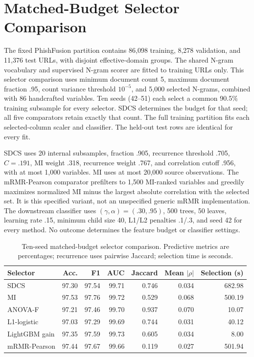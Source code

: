 \documentclass[10pt]{article}
\newenvironment{bluechange}{\color{black}}{}
\begin{document}
\section{Matched-Budget Selector Comparison}
\begin{bluechange}
The fixed PhishFusion partition contains 86,098 training, 8,278 validation, and 11,376 test URLs, with disjoint effective-domain groups. The shared N-gram vocabulary and supervised N-gram scorer are fitted to training URLs only. This selector comparison uses minimum document count 5, maximum document fraction .95, count variance threshold $10^{-5}$, and 5,000 selected N-grams, combined with 86 handcrafted variables. Ten seeds (42--51) each select a common 90.5\% training subsample for every selector. SDCS determines the budget for that seed; all five comparators retain exactly that count. The full training partition fits each selected-column scaler and classifier. The held-out test rows are identical for every fit.

SDCS uses 20 internal subsamples, fraction .905, recurrence threshold .705, $C=.191$, MI weight .318, recurrence weight .767, and correlation cutoff .956, with at most 1,000 variables. MI uses at most 20,000 source observations. The mRMR-Pearson comparator prefilters to 1,500 MI-ranked variables and greedily maximizes normalized MI minus the largest absolute correlation with the selected set. It is this specified variant, not an unspecified generic mRMR implementation. The downstream classifier uses $(\gamma,\alpha)=(.30,.95)$, 500 trees, 50 leaves, learning rate .15, minimum child size 40, L1/L2 penalties .1/.3, and seed 42 for every method. No outcome determines the feature budget or classifier settings.
\end{bluechange}
\begin{table}[ht]
\centering\color{black}\small
\caption{Ten-seed matched-budget selector comparison. Predictive metrics are percentages; recurrence uses pairwise Jaccard; selection time is seconds.}

\begin{tabular}{lrrrrrr}
\toprule
Selector & Acc. & F1 & AUC & Jaccard & Mean $|\rho|$ & Selection (s) \\
\midrule
SDCS & 97.30 & 97.54 & 99.71 & 0.746 & 0.034 & 682.98 \\
MI & 97.53 & 97.76 & 99.72 & 0.529 & 0.068 & 500.19 \\
ANOVA-F & 97.21 & 97.46 & 99.70 & 0.937 & 0.070 & 10.07 \\
L1-logistic & 97.03 & 97.29 & 99.69 & 0.744 & 0.031 & 40.12 \\
LightGBM gain & 97.35 & 97.59 & 99.73 & 0.605 & 0.034 & 8.00 \\
mRMR-Pearson & 97.44 & 97.67 & 99.66 & 0.119 & 0.027 & 501.94 \\
\bottomrule
\end{tabular}
\end{table}
\end{document}
